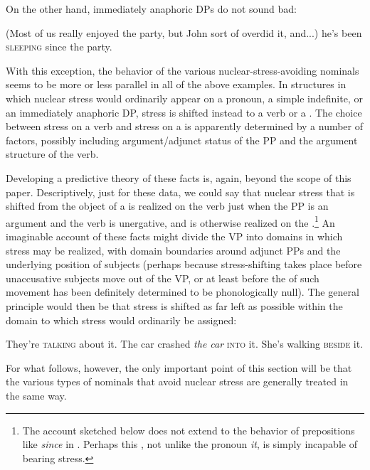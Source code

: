 \documentclass[output=paper]{LSP/langsci}
\begin{document}
On the other hand, immediately anaphoric DPs do not sound bad:


\ea%
    \label{ex:richards:15}
	  (Most of us really enjoyed the party, but John sort of overdid it, and...)       he's been \textsc{sleeping} since the party.
\z


With this exception, the behavior of the various nuclear-stress-avoiding nominals seems to be more or less parallel in all of the above examples.  In structures in which nuclear stress would ordinarily appear on a pronoun, a simple indefinite, or an immediately anaphoric DP, stress is shifted instead to a verb or a .  The choice between stress on a verb and stress on a  is apparently determined by a number of factors, possibly including argument/adjunct status of the PP and the argument structure of the verb.

  Developing a predictive theory of these facts is, again, beyond the scope of this paper.  Descriptively, just for these data, we could say that nuclear stress that is shifted from the object of a  is realized on the verb just when the PP is an argument and the verb is unergative, and is otherwise realized on the .\footnote{The account sketched below does not extend to the behavior of prepositions like \textit{since} in .  Perhaps this , not unlike the pronoun \textit{it}, is simply incapable of bearing stress.}  An imaginable account of these facts might divide the VP into domains in which stress may be realized, with domain boundaries around adjunct PPs and the underlying position of subjects (perhaps because stress-shifting takes place before unaccusative subjects move out of the VP, or at least before the  of such movement has been definitely determined to be phonologically null).  The general principle would then be that stress is shifted as far left as possible within the domain to which stress would ordinarily be assigned:

\settowidth{}
\ea%
    \label{ex:richards:16prim} %
\ea They're {\textbar} \textsc{talking} about it. {\textbar}
\ex The car {\textbar} crashed {\textbar} \textit{the car}\textit{} {\textbar} \textsc{into} it. {\textbar}    
\ex She's {\textbar} walking {\textbar}\textsc{ beside} it. {\textbar}{\textbar}      
\z
\z

For what follows, however, the only important point of this section will be that the various types of nominals that avoid nuclear stress are generally treated in the same way.
\end{document}
